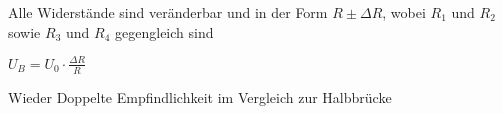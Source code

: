 \documentclass[letterpaper,10pt,english]{jupyterBook}
\begin{document}
\begin{DUlineblock}{0em}
\item[] 
\end{DUlineblock}

\sphinxAtStartPar
Alle Widerstände sind veränderbar
und in der Form \(R \pm \Delta R\),
wobei \(R_1\) und \(R_2\) sowie \(R_3\) und \(R_4\) gegengleich sind

\sphinxAtStartPar
\(U_B = U_0 \cdot \frac{\Delta R}{R}\)

\sphinxAtStartPar
Wieder Doppelte Empfindlichkeit im Vergleich zur Halbbrücke

\begin{DUlineblock}{0em}
\item[] 
\end{DUlineblock}

\begin{DUlineblock}{0em}
\item[] 
\end{DUlineblock}
\end{document}
